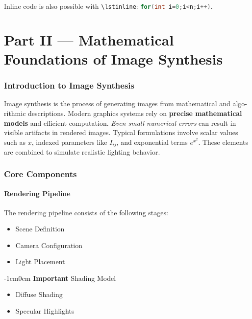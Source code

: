 \documentclass[11pt,a4paper]{article}
\theoremstyle{plain}
\theoremstyle{definition}
\theoremstyle{remark}
\begin{document}
\noindent Inline code is also possible with \verb|\lstinline|: \lstinline[language=C]|for(int i=0;i<n;i++)|.

\clearpage
\part*{Part II --- Mathematical Foundations of Image Synthesis}

\section{Introduction to Image Synthesis}
Image synthesis is the process of generating images from mathematical and algo-rithmic descriptions. Modern graphics systems rely on \textbf{precise mathematical models} and efficient computation. \emph{Even small numerical errors} can result in visible artifacts in rendered images. Typical formulations involve scalar values such as $x$, indexed parameters
like $I_{ij}$, and exponential terms $e^{x^2}$. These elements are combined to simulate realistic lighting behavior.

\section{Core Components}
\subsection{Rendering Pipeline}
The rendering pipeline consists of the following stages:

\begin{itemize}
    \item Scene Definition
    \item Camera Configuration
    \item[-] Light Placement
\end{itemize}

\begin{changemargin}{-1cm}{0cm}
\textbf{Important} Shading Model\end{changemargin}
\begin{itemize}
    \item[-] Diffuse Shading
    \item[-] Specular Highlights
\end{itemize}
\end{document}
